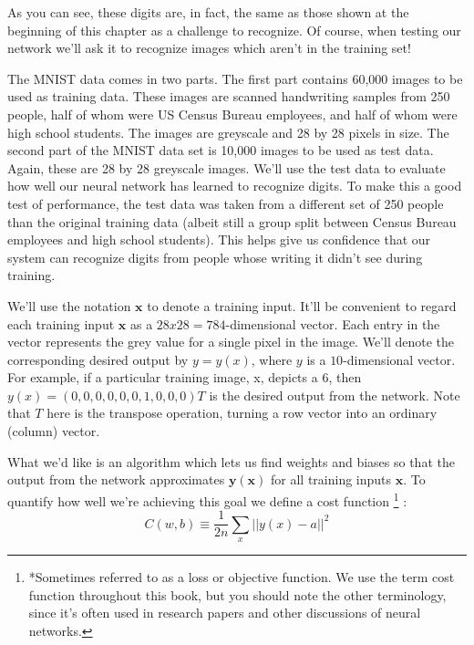 \documentclass[a4paper,12pt]{report}%
\begin{document}
As you can see, these digits are, in fact, the same as those shown at the beginning of this chapter as a challenge to recognize. Of course, when testing our network we'll ask it to recognize images which aren't in the training set!

The MNIST data comes in two parts. The first part contains 60,000 images to be used as training data. These images are scanned handwriting samples from 250 people, half of whom were US Census Bureau employees, and half of whom were high school students. The images are greyscale and 28 by 28 pixels in size. The second part of the MNIST data set is 10,000 images to be used as test data. Again, these are 28 by 28 greyscale images. We'll use the test data to evaluate how well our neural network has learned to recognize digits. To make this a good test of performance, the test data was taken from a different set of 250 people than the original training data (albeit still a group split between Census Bureau employees and high school students). This helps give us confidence that our system can recognize digits from people whose writing it didn't see during training.

We'll use the notation $\mathbf{x}$ to denote a training input. It'll be convenient to regard each training input $\mathbf{x}$ as a $28 x 28 = 784$-dimensional vector. Each entry in the vector represents the grey value for a single pixel in the image. We'll denote the corresponding desired output by $y=y(x)$, where $y$ is a $10$-dimensional vector. For example, if a particular training image, x, depicts a $6$, then $y(x)=(0,0,0,0,0,0,1,0,0,0)T$ is the desired output from the network. Note that $T$ here is the transpose operation, turning a row vector into an ordinary (column) vector.

What we'd like is an algorithm which lets us find weights and biases so that the output from the network approximates $\mathbf{y(x)}$ for all training inputs $\mathbf{x}$. To quantify how well we're achieving this goal we define a cost function \footnote{\color{blue}*Sometimes referred to as a loss or objective function. We use the term cost function throughout this book, but you should note the other terminology, since it's often used in research papers and other discussions of neural networks.} :
\begin{equation}
C(w,b) \equiv \frac{1}{2n} \sum_{x} || y(x)−a ||^{2}
\end{equation}

\smallskip
\end{document}
